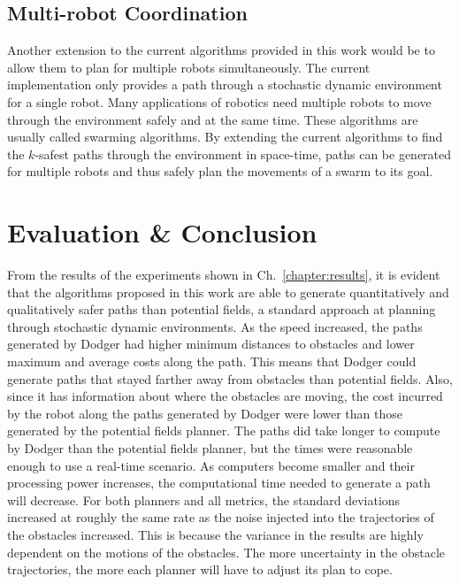 \documentclass[letterpaper, 10pt, conference]{ieeeconf}
\begin{document}
\subsection{Multi-robot Coordination}

Another extension to the current algorithms provided in this work would be to
allow them to plan for multiple robots simultaneously. The current
implementation only provides a path through a stochastic dynamic environment
for a single robot. Many applications of robotics need multiple robots to move
through the environment safely and at the same time. These algorithms are
usually called swarming algorithms. By extending the current algorithms to find
the $k$-safest paths through the environment in space-time, paths can be
generated for multiple robots and thus safely plan the movements of a swarm to
its goal.

\section{Evaluation \& Conclusion}

From the results of the experiments shown in Ch.~\ref{chapter:results}, it is
evident that the algorithms proposed in this work are able to generate
quantitatively and qualitatively safer paths than potential fields, a standard
approach at planning through stochastic dynamic environments. As the speed
increased, the paths generated by Dodger had higher minimum distances to
obstacles and lower maximum and average costs along the path. This means that
Dodger could generate paths that stayed farther away from obstacles than
potential fields. Also, since it has information about where the obstacles are
moving, the cost incurred by the robot along the paths generated by Dodger were
lower than those generated by the potential fields planner. The paths did take
longer to compute by Dodger than the potential fields planner, but the times
were reasonable enough to use a real-time scenario. As computers become smaller
and their processing power increases, the computational time needed to generate
a path will decrease. For both planners and all metrics, the standard
deviations increased at roughly the same rate as the noise injected into the
trajectories of the obstacles increased. This is because the variance in the
results are highly dependent on the motions of the obstacles. The more
uncertainty in the obstacle trajectories, the more each planner will have to
adjust its plan to cope.
\end{document}
